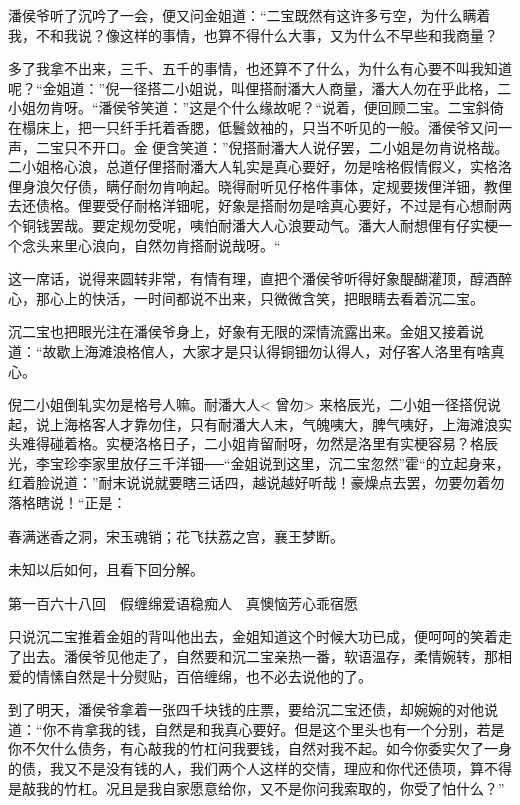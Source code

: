 \documentclass[12pt,UTF8]{ctexbook}
\begin{document}
{{{潘侯爷听了沉吟了一会，便又问金姐道：“二宝既然有这许多亏空，为什么瞒着我，不和我说？像这样的事情，也算不得什么大事，又为什么不早些和我商量？

多了我拿不出来，三千、五千的事情，也还算不了什么，为什么有心要不叫我知道呢？“金姐道：”倪一径搭二小姐说，叫俚搭耐潘大人商量，潘大人勿在乎此格，二小姐勿肯呀。“潘侯爷笑道：”这是个什么缘故呢？“说着，便回顾二宝。二宝斜倚在榻床上，把一只纤手托着香腮，低鬟敛袖的，只当不听见的一般。潘侯爷又问一声，二宝只不开口。金便含笑道：”倪搭耐潘大人说仔罢，二小姐是勿肯说格哉。二小姐格心浪，总道仔俚搭耐潘大人轧实是真心要好，勿是啥格假情假义，实格洛俚身浪欠仔债，瞒仔耐勿肯响起。晓得耐听见仔格件事体，定规要拨俚洋钿，教俚去还债格。俚要受仔耐格洋钿呢，好象是搭耐勿是啥真心要好，不过是有心想耐两个铜钱罢哉。要定规勿受呢，咦怕耐潘大人心浪要动气。潘大人耐想俚有仔实梗一个念头来里心浪向，自然勿肯搭耐说哉呀。“

这一席话，说得来圆转非常，有情有理，直把个潘侯爷听得好象醍醐灌顶，醇酒醉心，那心上的快活，一时间都说不出来，只微微含笑，把眼睛去看着沉二宝。

沉二宝也把眼光注在潘侯爷身上，好象有无限的深情流露出来。金姐又接着说道：“故歇上海滩浪格倌人，大家才是只认得铜钿勿认得人，对仔客人洛里有啥真心。

倪二小姐倒轧实勿是格号人嘛。耐潘大人< 曾勿> 来格辰光，二小姐一径搭倪说起，说上海格客人才靠勿住，只有耐潘大人末，气魄咦大，脾气咦好，上海滩浪实头难得碰着格。实梗洛格日子，二小姐肯留耐呀，勿然是洛里有实梗容易？格辰光，李宝珍李家里放仔三千洋钿──“金姐说到这里，沉二宝忽然”霍“的立起身来，红着脸说道：”耐末说说就要瞎三话四，越说越好听哉！豪燥点去罢，勿要勿着勿落格瞎说！“正是：

春满迷香之洞，宋玉魂销；花飞扶荔之宫，襄王梦断。

未知以后如何，且看下回分解。





第一百六十八回　假缠绵爱语稳痴人　真懊恼芳心乖宿愿





只说沉二宝推着金姐的背叫他出去，金姐知道这个时候大功已成，便呵呵的笑着走了出去。潘侯爷见他走了，自然要和沉二宝亲热一番，软语温存，柔情婉转，那相爱的情愫自然是十分熨贴，百倍缠绵，也不必去说他的了。

到了明天，潘侯爷拿着一张四千块钱的庄票，要给沉二宝还债，却婉婉的对他说道：“你不肯拿我的钱，自然是和我真心要好。但是这个里头也有一个分别，若是你不欠什么债务，有心敲我的竹杠问我要钱，自然对我不起。如今你委实欠了一身的债，我又不是没有钱的人，我们两个人这样的交情，理应和你代还债项，算不得是敲我的竹杠。况且是我自家愿意给你，又不是你问我索取的，你受了怕什么？”

}}}
\end{document}

